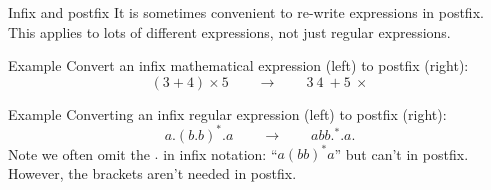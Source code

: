 \begin{frame}{Infix and postfix}
  It is sometimes convenient to re-write expressions in postfix.
  This applies to lots of different expressions, not just regular expressions.
  \begin{exampleblock}{Example}
    Convert an infix mathematical expression (left) to postfix (right):
    $$(3+4) \times 5 \qquad \rightarrow \qquad 3 \ 4 \  + 5 \  \times$$
  \end{exampleblock}
  \begin{exampleblock}{Example}
    Converting an infix regular expression (left) to postfix (right):
    $$a.(b.b)^*.a \qquad  \rightarrow  \qquad  abb.^*.a.$$
    Note we often omit the $.$ in infix notation: ``$a(bb)^*a$'' but can't in postfix.
    However, the brackets aren't needed in postfix.
  \end{exampleblock}
\end{frame}